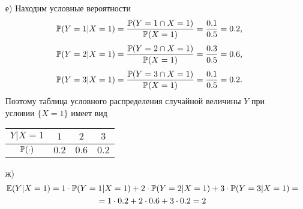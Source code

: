 \begin{enumerate}
\begin{enumerate}
\item[е)] Находим условные вероятности
\[
\P(Y=1 | X=1 ) = \frac{\P( Y=1  \cap  X=1 )}{\P( X=1 )} = \frac{0.1}{0.5} = 0.2 \text{,}
\]
\[
\P( Y=2 | X=1 ) = \frac{\P( Y=2  \cap  X=1 )}{\P( X=1 )} = \frac{0.3}{0.5} = 0.6 \text{,}
\]
\[
\P( Y=3 | X=1 ) = \frac{\P( Y=3  \cap  X=1 )}{\P( X=1 )} = \frac{0.1}{0.5} = 0.2 \text{.}
\]
Поэтому таблица условного распределения случайной величины $Y$ при условии $\{X = 1\}$ имеет вид
\begin{center}
\begin{tabular}{@{}cccc@{}}
\toprule
$Y | X=1$         & $1$   & $2$   & $3$ \\ \midrule
$\P(\cdot)$ & $0.2$ & $0.6$ & $0.2$ \\ \bottomrule
\end{tabular}
\end{center}

\item[ж)]
\begin{multline*}
\E(Y|X=1) = 1 \cdot \P(Y=1 | X=1) + 2 \cdot \P(Y=2 | X=1) + 3 \cdot \P(Y=3 | X=1) = \\
= 1 \cdot 0.2 + 2 \cdot 0.6 + 3 \cdot 0.2 = 2
\end{multline*}
\end{enumerate}
\end{enumerate}

